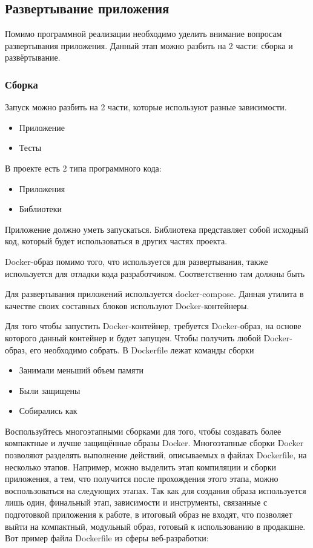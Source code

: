 \subsection{\large{Развертывание приложения}}

Помимо программной реализации необходимо уделить внимание вопросам развертывания приложения.
Данный этап можно разбить на 2 части: сборка и развёртывание.

\subsubsection{Сборка}

Запуск можно разбить на 2 части, которые используют разные зависимости.
\begin{itemize}
    \item Приложение
    \item Тесты
\end{itemize}


В проекте есть 2 типа программного кода:
\begin{itemize}
    \item Приложения
    \item Библиотеки
\end{itemize}

Приложение должно уметь запускаться.
Библиотека представляет собой исходный код, который будет использоваться в других частях проекта.

Docker-образ помимо того, что используется для развертывания, также используется для отладки кода разработчиком.
Соответственно там должны быть


Для развертывания приложений используется docker-compose.
Данная утилита в качестве своих составных блоков используют Docker-контейнеры.

Для того чтобы запустить Docker-контейнер, требуется Docker-образ, на основе которого данный контейнер и будет
запущен.
Чтобы получить любой Docker-образ, его необходимо собрать. В Dockerfile лежат команды сборки


\begin{itemize}
    \item Занимали меньший объем памяти
    \item Были защищены
    \item Собирались как
\end{itemize}

Воспользуйтесь многоэтапными сборками для того, чтобы создавать более компактные и лучше защищённые образы Docker.
Многоэтапные сборки Docker позволяют разделять выполнение действий, описываемых в файлах Dockerfile,
на несколько этапов. Например, можно выделить этап компиляции и сборки приложения,
а тем, что получится после прохождения этого этапа, можно воспользоваться на следующих этапах.
Так как для создания образа используется лишь один, финальный этап,
зависимости и инструменты, связанные с подготовкой приложения к работе,
в итоговый образ не входят, что позволяет выйти на компактный, модульный образ, готовый к использованию в продакшне.
Вот пример файла Dockerfile из сферы веб-разработки:

